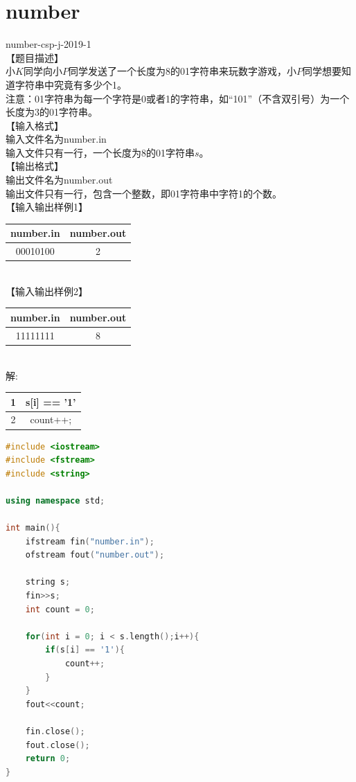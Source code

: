 \documentclass[12pt,twiside,a4paper]{ctexbook}
\numberwithin{chapter}{part}
\begin{document}
\section{number}
number-csp-j-2019-1\\
【题目描述】\\
小$K$同学向小$P$同学发送了一个长度为8的01字符串来玩数字游戏，小$P$同学想要知道字符串中究竟有多少个1。\\
注意：01字符串为每一个字符是0或者1的字符串，如“101”（不含双引号）为一个长度为3的01字符串。\\
【输入格式】\\
输入文件名为number.in\\
输入文件只有一行，一个长度为8的01字符串$s$。\\
【输出格式】\\
输出文件名为number.out\\
输出文件只有一行，包含一个整数，即01字符串中字符1的个数。\\
【输入输出样例1】\\
\begin{tabular}{|c|c|}
\hline
number.in & number.out\\
\hline
00010100 & 2\\
\hline
\end{tabular}\\
【输入输出样例2】\\
\begin{tabular}{|c|c|}
\hline
number.in & number.out\\
\hline
11111111 & 8\\
\hline
\end{tabular}\\
解:\\
\begin{tabular}{|c|c|}
\hline
1 & s[i] == '1'\\
\hline
2 & count++; \\
\hline
\end{tabular}
\begin{lstlisting}[language=c++]
#include <iostream>
#include <fstream>
#include <string>

using namespace std;

int main(){
	ifstream fin("number.in");
	ofstream fout("number.out");

	string s;
	fin>>s;
	int count = 0;

	for(int i = 0; i < s.length();i++){
		if(s[i] == '1'){
			count++;
		}
	}
	fout<<count;

	fin.close();
	fout.close();
	return 0;
}
\end{lstlisting}
\end{document}
